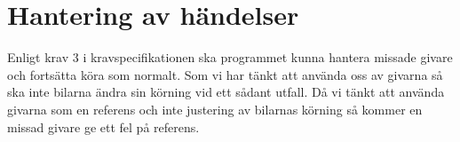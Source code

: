 \section{Hantering av händelser}




Enligt krav 3 i kravspecifikationen ska programmet kunna hantera missade givare och fortsätta köra som normalt. Som vi har tänkt att använda oss av givarna så ska inte bilarna ändra sin körning vid ett sådant utfall. Då vi tänkt att använda givarna som en referens och inte justering av bilarnas körning så kommer en missad givare ge ett fel på referens.

